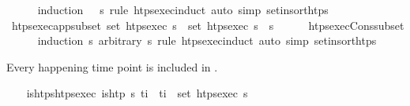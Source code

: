 \begin{isabellebody}
%
\isadelimproof
\ \ \ \ %
\endisadelimproof
%
\isatagproof
{}\isamarkupfalse%
\ {\isacharparenleft}{\kern0pt}induction\ {\isachardoublequoteopen}{\isasympi}\ {\isacharhash}{\kern0pt}\ {\isasympi}s{\isachardoublequoteclose}\ rule{\isacharcolon}{\kern0pt}\ htps{\isacharunderscore}{\kern0pt}exec{\isachardot}{\kern0pt}induct{\isacharparenright}{\kern0pt}\ {\isacharparenleft}{\kern0pt}auto\ simp{\isacharcolon}{\kern0pt}\ set{\isacharunderscore}{\kern0pt}insort{\isacharunderscore}{\kern0pt}htps{\isacharparenright}{\kern0pt}%
\endisatagproof
{\isafoldproof}%
%
\isadelimproof
\isanewline
%
\endisadelimproof
\isanewline
\ \ \isamarkupfalse%
\ htps{\isacharunderscore}{\kern0pt}exec{\isacharunderscore}{\kern0pt}app{\isacharunderscore}{\kern0pt}subset{\isacharcolon}{\kern0pt}\ {\isachardoublequoteopen}set\ {\isacharparenleft}{\kern0pt}htps{\isacharunderscore}{\kern0pt}exec\ {\isasympi}s\ {\isasymsubseteq}\ set\ {\isacharparenleft}{\kern0pt}htps{\isacharunderscore}{\kern0pt}exec\ {\isacharparenleft}{\kern0pt}{\isasympi}s\ {\isacharat}{\kern0pt}\ {\isasympi}s\isanewline
%
\isadelimproof
\ \ \ \ %
\endisadelimproof
%
\isatagproof
{}\isamarkupfalse%
\ htps{\isacharunderscore}{\kern0pt}exec{\isacharunderscore}{\kern0pt}Cons{\isacharunderscore}{\kern0pt}subset\isanewline
\ \ \ \ \isamarkupfalse%
\ {\isacharparenleft}{\kern0pt}induction\ {\isasympi}s\ arbitrary{\isacharcolon}{\kern0pt}\ {\isasympi}s\ rule{\isacharcolon}{\kern0pt}\ htps{\isacharunderscore}{\kern0pt}exec{\isachardot}{\kern0pt}induct{\isacharparenright}{\kern0pt}\ {\isacharparenleft}{\kern0pt}auto\ simp{\isacharcolon}{\kern0pt}\ set{\isacharunderscore}{\kern0pt}insort{\isacharunderscore}{\kern0pt}htps{\isacharparenright}{\kern0pt}%
\endisatagproof
{\isafoldproof}%
%
\isadelimproof
%
\endisadelimproof
%
\begin{isamarkuptext}%
Every happening time point is included in .%
\end{isamarkuptext}\isamarkuptrue%
\ \ \isamarkupfalse%
\ is{\isacharunderscore}{\kern0pt}htps{\isacharunderscore}{\kern0pt}htps{\isacharunderscore}{\kern0pt}exec{\isacharcolon}{\kern0pt}\ {\isachardoublequoteopen}is{\isacharunderscore}{\kern0pt}htp\ {\isasympi}s\ t\isactrlsub i\ {\isasymLongrightarrow}\ t\isactrlsub i\ {\isasymin}\ set\ {\isacharparenleft}{\kern0pt}htps{\isacharunderscore}{\kern0pt}exec\ {\isasympi}s{\isacharparenright}{\kern0pt}{\isachardoublequoteclose}\isanewline

\end{isabellebody}
